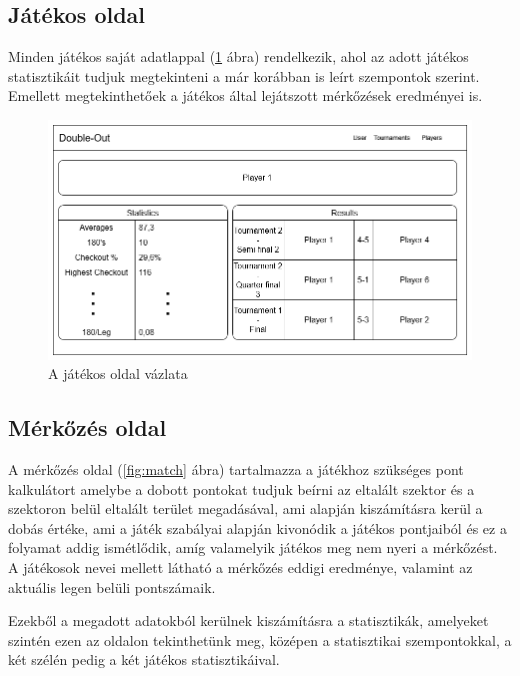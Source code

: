 \subsection{Játékos oldal}
Minden játékos saját adatlappal (\ref{fig:player} ábra) rendelkezik, ahol az adott játékos statisztikáit tudjuk megtekinteni a már korábban is leírt szempontok szerint.
Emellett megtekinthetőek a játékos által lejátszott mérkőzések eredményei is.

\begin{figure}[h]
\centering
\includegraphics[scale=0.4]{images/PlayerPage.png}
\caption{A játékos oldal vázlata}
\label{fig:player}
\end{figure}

\subsection{Mérkőzés oldal}
A mérkőzés oldal (\ref{fig:match} ábra) tartalmazza a játékhoz szükséges pont kalkulátort amelybe a dobott pontokat tudjuk beírni az eltalált szektor és a szektoron belül eltalált terület megadásával, ami alapján kiszámításra kerül a dobás értéke, ami a játék szabályai alapján kivonódik a játékos pontjaiból és ez a folyamat addig ismétlődik, amíg valamelyik játékos meg nem nyeri a mérkőzést. A játékosok nevei mellett látható a mérkőzés eddigi eredménye, valamint az aktuális legen belüli pontszámaik.

Ezekből a megadott adatokból kerülnek kiszámításra a statisztikák, amelyeket szintén ezen az oldalon tekinthetünk meg, középen a statisztikai szempontokkal, a két szélén pedig a két játékos statisztikáival.

